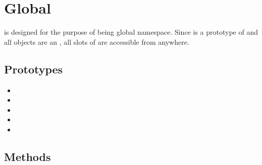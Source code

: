 \section{Global}

 is designed for the purpose of being global
namespace. Since  is a prototype of  and all
objects are an , all slots of  are accessible from
anywhere.

\subsection{Prototypes}
\begin{itemize}
\item {}
\item {}
\item {}
\item {}
\item {}
\end{itemize}

\subsection{Methods}

